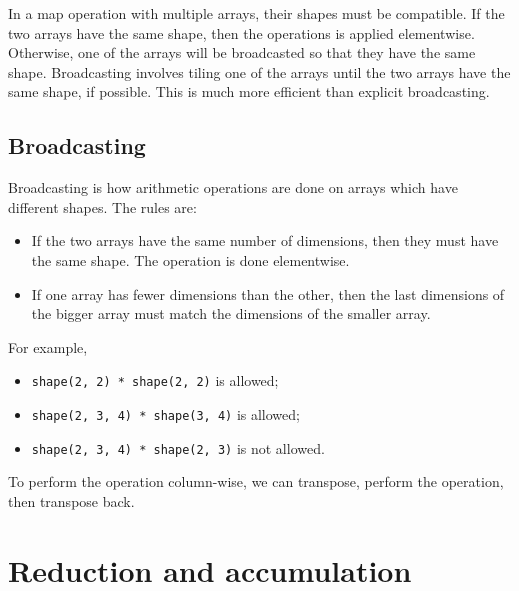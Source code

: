 \documentclass[a4paper, openany]{memoir}
\begin{document}
    In a map operation with multiple arrays, their shapes must be compatible. If the two arrays have the same shape, then the operations is applied elementwise. Otherwise, one of the arrays will be broadcasted so that they have the same shape. Broadcasting involves tiling one of the arrays until the two arrays have the same shape, if possible. This is much more efficient than explicit broadcasting.

    \subsection{Broadcasting}
    Broadcasting is how arithmetic operations are done on arrays which have different shapes. The rules are:
    \begin{itemize}
        \item If the two arrays have the same number of dimensions, then they must have the same shape. The operation is done elementwise.
        \item If one array has fewer dimensions than the other, then the last dimensions of the bigger array must match the dimensions of the smaller array.
    \end{itemize}
    For example,
    \begin{itemize}
        \item \texttt{shape(2, 2) * shape(2, 2)} is allowed;
        \item \texttt{shape(2, 3, 4) * shape(3, 4)} is allowed;
        \item \texttt{shape(2, 3, 4) * shape(2, 3)} is not allowed.
    \end{itemize}
    To perform the operation column-wise, we can transpose, perform the operation, then transpose back.
    \newpage

    \section{Reduction and accumulation}
\end{document}
